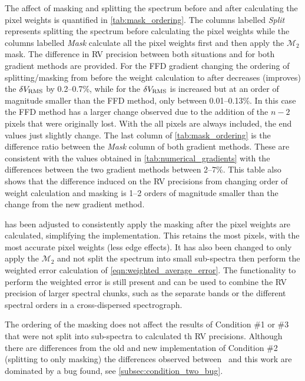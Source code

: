 The affect of masking and splitting the spectrum before and after calculating the pixel weights is quantified in \cref{tab:mask_ordering}.
The columns labelled \emph{Split} represents splitting the spectrum before calculating the pixel weights while the columns labelled \emph{Mask} calculate all the pixel weights first and then apply the \({\mathcal{M}}_{2}\) mask.
The difference in {RV} precision between both situations and for both gradient methods are provided.
For the {FFD} gradient changing the ordering of splitting/masking from before the weight calculation to after decreases (improves) the {\(\delta V_{\textrm{RMS}}\)} by 0.2--0.7\%, while for \npgradient{} the \(\delta V_{\textrm{RMS}}\) is increased but at an order of magnitude smaller than the {FFD} method, only between 0.01--0.13\%.
In this case the {FFD} method has a larger change observed due to the addition of the \(n-2\) pixels that were originally lost.
With the \npgradient{} all pixels are always included, the end values just slightly change.
The last column of \cref{tab:mask_ordering} is the difference ratio between the \emph{Mask} column of both gradient methods.
These are consistent with the values obtained in \cref{tab:numerical_gradients} with the differences between the two gradient methods between 2--7\%.
This table also shows that the difference induced on the {RV} precisions from changing order of weight  calculation and masking is 1--2 orders of magnitude smaller than the change from the new gradient method.

\Eniric{} has been adjusted to consistently apply the masking after the pixel weights are calculated, simplifying the implementation.
This retains the most pixels, with the most accurate pixel weights (less edge effects).
It has also been changed to only apply the \({\mathcal{M}}_{2}\) and not split the spectrum into small sub-spectra then perform the weighted error calculation of \cref{eqn:weighted_average_error}.
The functionality to perform the weighted error is still present and can be used to combine the {RV} precision of larger spectral chunks, such as the separate \nir{} bands or the different spectral orders in a cross-dispersed spectrograph.



The ordering of the masking does not affect the results of Condition \#1 or \#3 that were not split into sub-spectra to calculated th RV precisions.
Although there are differences from the old and new implementation of Condition \#2 (splitting to only masking) the differences observed between~\citet{figueira_radial_2016} and this work are dominated by a bug found, see \cref{subsec:condition_two_bug}.


